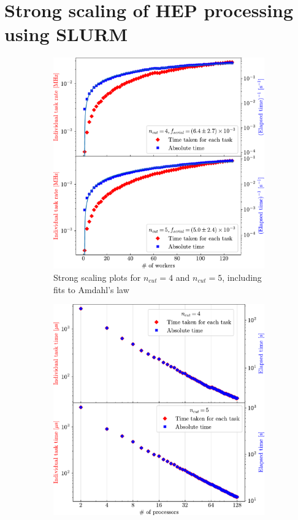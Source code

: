 \documentclass{article}
\begin{document}
\section{Strong scaling of HEP processing using SLURM}
\begin{figure}
\begin{subfigure}[t]{0.5\textwidth}
    \centering
    \includegraphics[width=\textwidth]{Assignment_3_Task_farming/Report/Amdahl.pdf}
    \caption{Strong scaling plots for $n_{cut}=4$ and $n_{cut}=5$, including fits to Amdahl's law}
    \label{fig:Amdahl}
\end{subfigure}
\begin{subfigure}[t]{0.5\textwidth}
    \centering
    \includegraphics[width=\textwidth]{Assignment_3_Task_farming/Report/Time_scaling.pdf}

\end{subfigure}
\end{figure}
\end{document}
